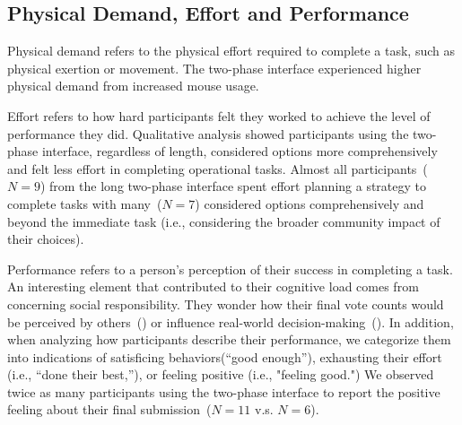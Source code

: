 


\subsection{Physical Demand, Effort and Performance}
Physical demand refers to the physical effort required to complete a task, such as physical exertion or movement. The two-phase interface experienced higher physical demand from increased mouse usage.

Effort refers to how hard participants felt they worked to achieve the level of performance they did. Qualitative analysis showed participants using the two-phase interface, regardless of length, considered options more comprehensively and felt less effort in completing operational tasks. Almost all participants~($N=9$) from the long two-phase interface spent effort planning a strategy to complete tasks with many~($N=7$) considered options comprehensively and beyond the immediate task (i.e., considering the broader community impact of their choices). 

Performance refers to a person's perception of their success in completing a task. An interesting element that contributed to their cognitive load comes from concerning social responsibility. They wonder how their final vote counts would be perceived by others~() or influence real-world decision-making~(). In addition, when analyzing how participants describe their performance, we categorize them into indications of satisficing behaviors(``good enough''), exhausting their effort (i.e., ``done their best,''), or feeling positive (i.e., "feeling good.") We observed twice as many participants using the two-phase interface to report the positive feeling about their final submission~($N=11$ v.s. $N=6$).

